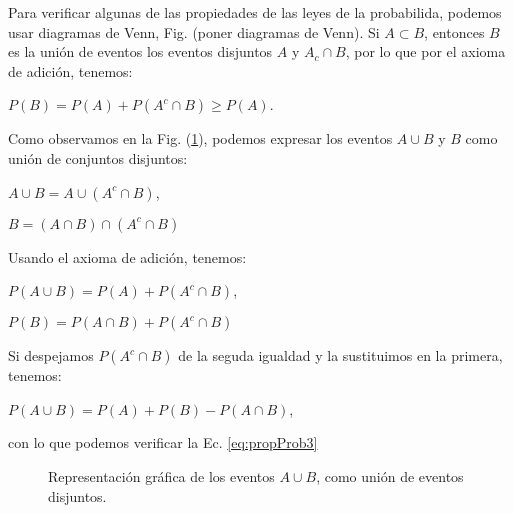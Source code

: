 Para verificar algunas de las propiedades de las leyes de la probabilida,
podemos usar diagramas de Venn, Fig. (poner diagramas de Venn). Si $A \subset
B$, entonces $B$ es la unión de eventos los eventos disjuntos $A$ y $A_c \cap
B$, por lo que por el axioma de adición, tenemos:

\begin{center}
    $P(B) = P(A) + P(A^c \cap B) \geq P(A)$.
\end{center}

Como observamos en la Fig. (\ref{fig:difer}), podemos expresar los eventos $A
\cup B$ y $B$ como unión de conjuntos disjuntos:

\begin{center}
    $A \cup B = A \cup (A^c \cap B)$,
\end{center}

\begin{center}
    $B = (A \cap B) \cap (A^c \cap B)$
\end{center}

Usando el axioma de adición, tenemos:

\begin{center}
    $P(A \cup B) = P(A) + P(A^c \cap B)$,
\end{center}

\begin{center}
    $P(B) = P(A \cap B) + P(A^c \cap B)$
\end{center}

Si despejamos $P(A^c \cap B)$ de la seguda igualdad y la sustituimos en la
primera, tenemos:

\begin{center}
    $P(A \cup B) = P(A) + P(B) - P(A \cap B)$,
\end{center}

con lo que podemos verificar la Ec. \eqref{eq:propProb3}

\begin{figure}
\centering
{}
\caption{Representación gráfica de los eventos $A \cup B$, como unión de eventos disjuntos.}
\label{fig:difer}
\end{figure}

